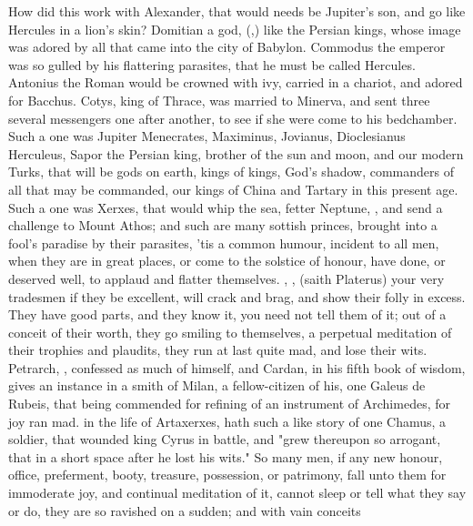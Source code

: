 How did this work with Alexander, that would needs be Jupiter's son, and go
like Hercules in a lion's skin? Domitian a god,
(,) like the
Persian kings, whose image was adored by all that came
into the city of Babylon. Commodus the emperor was so gulled by his flattering
parasites, that he must be called Hercules. Antonius the
Roman would be crowned with ivy, carried in a chariot, and adored for Bacchus.
Cotys, king of Thrace, was married to Minerva, and sent
three several messengers one after another, to see if she were come to his
bedchamber. Such a one was Jupiter Menecrates, Maximinus,
Jovianus, Dioclesianus Herculeus, Sapor the Persian king, brother of the sun
and moon, and our modern Turks, that will be gods on earth, kings of kings,
God's shadow, commanders of all that may be commanded, our kings of China and
Tartary in this present age. Such a one was Xerxes, that would whip the sea,
fetter Neptune, , and send a challenge to Mount Athos; and
such are many sottish princes, brought into a fool's paradise by their
parasites, 'tis a common humour, incident to all men, when they are in great
places, or come to the solstice of honour, have done, or deserved well, to
applaud and flatter themselves. , \etc{}, (saith
Platerus) your very tradesmen if they be excellent, will
crack and brag, and show their folly in excess. They have good parts, and they
know it, you need not tell them of it; out of a conceit of their worth, they go
smiling to themselves, a perpetual meditation of their trophies and plaudits,
they run at last quite mad, and lose their wits. Petrarch,
, confessed as much of himself,
and Cardan, in his fifth book of wisdom, gives an instance in a smith of Milan,
a fellow-citizen of his, one Galeus de Rubeis, that being
commended for refining of an instrument of Archimedes, for joy ran mad.
\Plutarch{} in the life of Artaxerxes, hath such a like story of one Chamus, a
soldier, that wounded king Cyrus in battle, and "grew thereupon so
arrogant, that in a short space after he lost his wits."
So many men, if any new honour, office, preferment, booty, treasure,
possession, or patrimony,  fall unto them for immoderate joy,
and continual meditation of it, cannot sleep or tell what
they say or do, they are so ravished on a sudden; and with vain conceits
